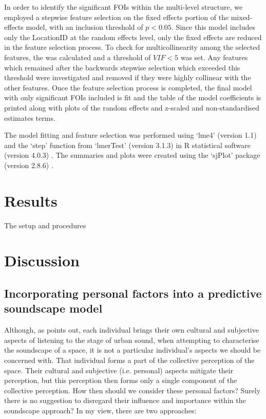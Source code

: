 In order to identify the significant FOIs within the multi-level structure, we employed a stepwise feature selection on the fixed effects portion of the mixed-effects model, with an inclusion threshold of $p < 0.05$. Since this model includes only the LocationID at the random effects level, only the fixed effects are reduced in the feature selection process. To check for multicollinearity among the selected features, the  was calculated and a threshold of $VIF < 5$ was set. Any features which remained after the backwards stepwise selection which exceeded this threshold were investigated and removed if they were highly collinear with the other features. Once the feature selection process is completed, the final model with only significant FOIs included is fit and the table of the model coefficients is printed along with plots of the random effects and z-scaled and non-standardised estimates terms. 

The model fitting and feature selection was performed using `lme4' (version 1.1) and the `step' function from `lmerTest' (version 3.1.3)  in R statistical software (version 4.0.3) . The summaries and plots were created using the `sjPlot' package (version 2.8.6) . 

\section{Results}

The setup and procedures %

\section{Discussion}
 \subsection{Incorporating personal factors into a predictive soundscape model}
Although, as \citet{Droumeva2021sound} points out, each individual brings their own cultural and subjective aspects of listening to the stage of urban sound, when attempting to characterise the soundscape of a space, it is not a particular individual's aspects we should be concerned with. That individual forms a part of the collective perception of the space. Their cultural and subjective (i.e. personal) aspects mitigate their perception, but this perception then forms only a single component of the collective perception. How then should we consider these personal factors? Surely there is no suggestion to disregard their influence and importance within the soundscape approach? In my view, there are two approaches:


